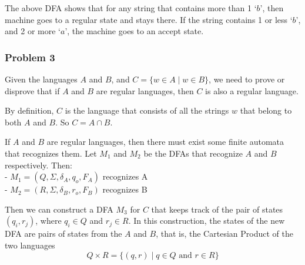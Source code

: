 \documentclass[addpoints]{exam}
\begin{document}
\begin{questions}
\begin{solution}
\begin{center}
	\end{center}
	The above DFA shows that for any string that contains more than 1 `$b$', then machine goes to a regular state and stays there. If the string contains 1 or less `$b$', and 2 or more `$a$', the machine goes to an accept state. 

	\newpage
	\subsubsection*{Problem 3}
	Given the languages $A$ and $B$, and $ C = \{ w \in A \mid w \in B \} $, we need to prove or disprove that if $ A $ and $ B $ are regular languages, then $ C $ is also a regular language.

	By definition, $C$ is the language that consists of all the strings $w$ that belong to both $A$ and $B$. So $C = A \cap B$. 

	If $A$ and $B$ are regular languages, then there must exist some finite automata that recognizes them. Let $M_1$ and $M_2$ be the DFAs that recognize $A$ and $B$ respectively. Then: \\ 
	\hspace*{5mm} - $M_1 = (Q, \Sigma, \delta_A, q_o, F_A)$ recognizes A \\
	\hspace*{5mm} - $M_2 = (R, \Sigma, \delta_B, r_o, F_B)$ recognizes B 
	
	Then we can construct a DFA $M_3$ for $C$ that keeps track of the pair of states $(q_i, r_j)$, where $q_i \in Q$ and $r_j \in R$. In this construction, the states of the new DFA are pairs of states from the $A$ and $B$, that is, the Cartesian Product of the two languages \vspace*{-2mm} $$ Q \times R = \{ (q, r) \mid q \in Q \text{ and } r \in R \} $$


\end{solution}
\end{questions}
\end{document}
